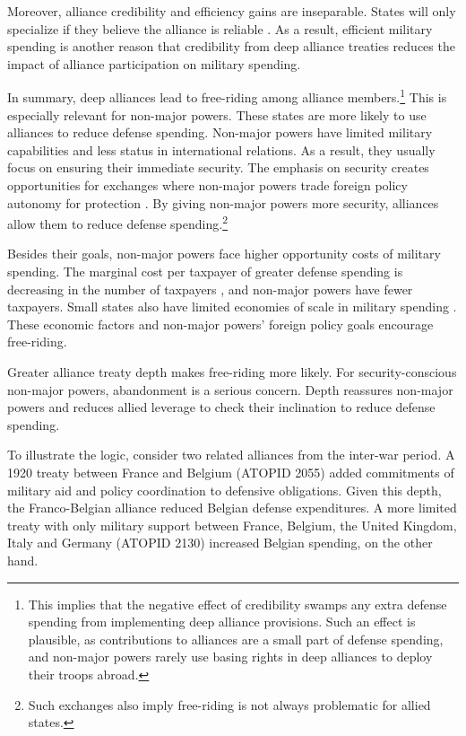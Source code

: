 \documentclass[12pt]{article}
\begin{document}
Moreover, alliance credibility and efficiency gains are inseparable. 
States will only specialize if they believe the alliance is reliable \citep{Leeds2003a}. 
As a result, efficient military spending is another reason that credibility from deep alliance treaties reduces the impact of alliance participation on military spending. 


In summary, deep alliances lead to free-riding among alliance members.\footnote{This implies that the negative effect of credibility swamps any extra defense spending from implementing deep alliance provisions. Such an effect is plausible, as contributions to alliances are a small part of defense spending, and non-major powers rarely use basing rights in deep alliances to deploy their troops abroad.} 
This is especially relevant for non-major powers.
These states are more likely to use alliances to reduce defense spending. 
Non-major powers have limited military capabilities and less status in international relations. 
As a result, they usually focus on ensuring their immediate security.  
The emphasis on security creates opportunities for exchanges where non-major powers trade foreign policy autonomy for protection \citep{Altfield1984, Morrow1991}. 
By giving non-major powers more security, alliances allow them to reduce defense spending.\footnote{Such exchanges also imply free-riding is not always problematic for allied states.} 


Besides their goals, non-major powers face higher opportunity costs of military spending. 
The marginal cost per taxpayer of greater defense spending is decreasing in the number of taxpayers \citep{DudleyMontmarquette1981}, and non-major powers have fewer taxpayers. 
Small states also have limited economies of scale in military spending \citep{Moravcsik1991, Kapstein1991, Anderton1995, Devore2013}.
These economic factors and non-major powers' foreign policy goals encourage free-riding.  


Greater alliance treaty depth makes free-riding more likely. 
For security-conscious non-major powers, abandonment is a serious concern. 
Depth reassures non-major powers and reduces allied leverage to check their inclination to reduce defense spending. 


To illustrate the logic, consider two related alliances from the inter-war period. 
A 1920 treaty between France and Belgium (ATOPID 2055) added commitments of military aid and policy coordination to defensive obligations. 
Given this depth, the Franco-Belgian alliance reduced Belgian defense expenditures. 
A more limited treaty with only military support between France, Belgium, the United Kingdom, Italy and Germany (ATOPID 2130) increased Belgian spending, on the other hand.   
 
\end{document}
